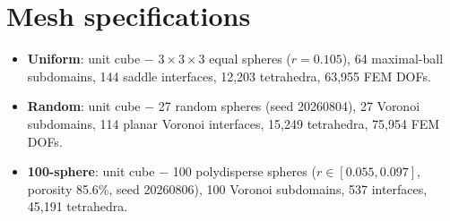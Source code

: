 \documentclass[11pt,a4paper]{article}
\begin{document}
\section*{Mesh specifications}

\begin{itemize}
  \setlength\itemsep{0pt}
  \item \textbf{Uniform}: unit cube $-$ $3\times3\times3$ equal spheres ($r=0.105$),
    64 maximal-ball subdomains, 144 saddle interfaces, 12,203 tetrahedra,
    63,955 FEM DOFs.
  \item \textbf{Random}: unit cube $-$ 27 random spheres (seed 20260804),
    27 Voronoi subdomains, 114 planar Voronoi interfaces, 15,249 tetrahedra,
    75,954 FEM DOFs.
  \item \textbf{100-sphere}: unit cube $-$ 100 polydisperse spheres
    ($r\in[0.055,0.097]$, porosity 85.6\%, seed 20260806),
    100 Voronoi subdomains, 537 interfaces, 45,191 tetrahedra.
\end{itemize}
\end{document}
